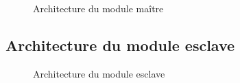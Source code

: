 		\begin{figure}[H]
			\centering
			\caption{Architecture du module maître}
			\label{fig:architecture_master}
		\end{figure}

	\subsection{Architecture du module esclave}
	
	\begin{figure}[H]
		\centering
		\caption{Architecture du module esclave}
		\label{fig:architecture_slave}
	\end{figure}


	